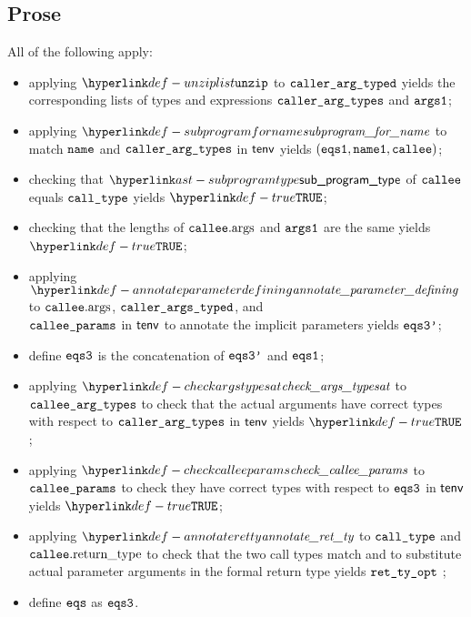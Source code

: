 \subsection{Prose}
All of the following apply:
\begin{itemize}
  \item applying $\unziplist$ to $\texttt{caller\_arg\_typed}$ yields the corresponding lists of types
        and expressions $\texttt{caller\_arg\_types}$ and $\texttt{args1}$;
  \item applying $\subprogramforname$ to match $\texttt{name}$ and $\texttt{caller\_arg\_types}$ in $\textsf{tenv}$
        yields $(\texttt{eqs1}, \texttt{name1}, \texttt{callee})$\ProseOrTypeError;
  \item checking that $\subprogramtype$ of $\texttt{callee}$ equals $\texttt{call\_type}$ yields $\True$\ProseOrTypeError;
  \item checking that the lengths of $\texttt{callee}.\text{args}$ and $\texttt{args1}$ are the same yields $\True$\ProseOrTypeError;
  \item applying $\annotateparameterdefining$ to $\texttt{callee}.\text{args}$,
        $\texttt{caller\_args\_typed}$, and \\
        $\texttt{callee\_params}$ in $\textsf{tenv}$ to annotate the implicit parameters
        yields $\texttt{eqs3'}$\ProseOrTypeError;
  \item define $\texttt{eqs3}$ is the concatenation of $\texttt{eqs3'}$ and $\texttt{eqs1}$;
  \item applying $\checkargstypesat$ to $\texttt{callee\_arg\_types}$
        to check that the actual arguments have correct types with respect to $\texttt{caller\_arg\_types}$
        in $\textsf{tenv}$ yields $\True$\ProseOrTypeError;
  \item applying $\checkcalleeparams$ to $\texttt{callee\_params}$ to check they have correct types
        with respect to $\texttt{eqs3}$ in $\textsf{tenv}$ yields $\True$\ProseOrTypeError;
  \item applying $\annotateretty$ to $\texttt{call\_type}$ and $\texttt{callee}.\text{return\_type}$
        to check that the two call types match and to substitute actual parameter arguments in the formal return type
        yields $\texttt{ret\_ty\_opt}$ \ProseOrTypeError;
  \item define $\texttt{eqs}$ as $\texttt{eqs3}$.
\end{itemize}


